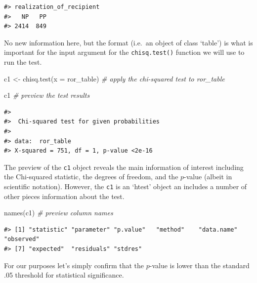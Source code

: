 \documentclass[
  letterpaper,
]{latex/krantz}
\newenvironment{Shaded}{\begin{snugshade}}{\end{snugshade}}
\newcommand{\AttributeTok}[1]{\textcolor[rgb]{0.00,0.00,0.00}{#1}}
\newcommand{\CommentTok}[1]{\textcolor[rgb]{0.00,0.00,0.00}{\textit{#1}}}
\newcommand{\DecValTok}[1]{\textcolor[rgb]{0.00,0.00,0.00}{#1}}
\newcommand{\FunctionTok}[1]{\textcolor[rgb]{0.00,0.00,0.00}{#1}}
\newcommand{\NormalTok}[1]{\textcolor[rgb]{0.00,0.00,0.00}{#1}}
\newcommand{\OtherTok}[1]{\textcolor[rgb]{0.00,0.00,0.00}{#1}}
\newcommand{\SpecialCharTok}[1]{\textcolor[rgb]{0.00,0.00,0.00}{#1}}
\begin{document}
\begin{verbatim}
#> realization_of_recipient
#>   NP   PP 
#> 2414  849
\end{verbatim}

No new information here, but the format (i.e.~an object of class
`table') is what is important for the input argument for the
\texttt{chisq.test()} function we will use to run the test.

\begin{Shaded}
\begin{Highlighting}[]
\NormalTok{c1 }\OtherTok{\textless{}{-}} \FunctionTok{chisq.test}\NormalTok{(}\AttributeTok{x =}\NormalTok{ ror\_table) }\CommentTok{\# apply the chi{-}squared test to \textasciigrave{}ror\_table\textasciigrave{}}

\NormalTok{c1 }\CommentTok{\# preview the test results}
\end{Highlighting}
\end{Shaded}

\begin{verbatim}
#> 
#>  Chi-squared test for given probabilities
#> 
#> data:  ror_table
#> X-squared = 751, df = 1, p-value <2e-16
\end{verbatim}

The preview of the \texttt{c1} object reveals the main information of
interest including the Chi-squared statistic, the degrees of freedom,
and the \(p\)-value (albeit in scientific notation). However, the
\texttt{c1} is an `htest' object an includes a number of other pieces
information about the test.

\begin{Shaded}
\begin{Highlighting}[]
\FunctionTok{names}\NormalTok{(c1) }\CommentTok{\# preview column names}
\end{Highlighting}
\end{Shaded}

\begin{verbatim}
#> [1] "statistic" "parameter" "p.value"   "method"    "data.name" "observed" 
#> [7] "expected"  "residuals" "stdres"
\end{verbatim}

For our purposes let's simply confirm that the \(p\)-value is lower than
the standard .05 threshold for statistical significance.

\begin{Shaded}
\end{Shaded}
\end{document}
